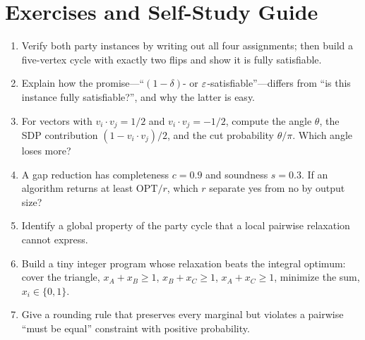 \section{Exercises and Self-Study Guide}
\begin{enumerate}[label=\textbf{E\arabic*.}]
\item Verify both party instances by writing out all four assignments; then build a five-vertex cycle with exactly two flips and show it is fully satisfiable.
\item Explain how the promise---``$(1-\delta)$- or $\varepsilon$-satisfiable''---differs from ``is this instance fully satisfiable?'', and why the latter is easy.
\item For vectors with $v_i\cdot v_j=1/2$ and $v_i\cdot v_j=-1/2$, compute the angle $\theta$, the SDP contribution $(1-v_i\cdot v_j)/2$, and the cut probability $\theta/\pi$. Which angle loses more?
\item A gap reduction has completeness $c=0.9$ and soundness $s=0.3$. If an algorithm returns at least $\mathrm{OPT}/r$, which $r$ separate yes from no by output size?
\item Identify a global property of the party cycle that a local pairwise relaxation cannot express.
\item Build a tiny integer program whose relaxation beats the integral optimum: cover the triangle, $x_A+x_B\ge1$, $x_B+x_C\ge1$, $x_A+x_C\ge1$, minimize the sum, $x_i\in\{0,1\}$.
\item Give a rounding rule that preserves every marginal but violates a pairwise ``must be equal'' constraint with positive probability.
\end{enumerate}

\clearpage
